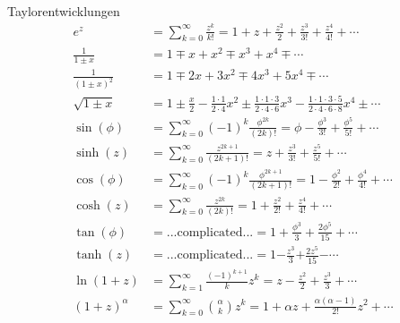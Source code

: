 \begin{Diverses}{Taylorentwicklungen}{}
    \begin{align*}
    e^z &= \sum_{k=0}^{\infty} \frac{z^k}{k!} = 1 + z + \frac{z^2}{2}+ \frac{z^3}{3!}+ \frac{z^4}{4!} + \cdots \\
    \frac{1}{1 \pm x} &= 1 \mp x + x^2 \mp x^3 + x^4 \mp \cdots\\
    \frac{1}{(1 \pm x)^2} &= 1 \mp 2x + 3x^2 \mp 4x^3 + 5x^4 \mp \cdots \\
    \sqrt{1 \pm x} &= 1 \pm \frac{x}{2} - \frac{\scriptstyle{1\cdot 1}}{\scriptstyle{2 \cdot 4}}x^2 \pm \frac{\scriptstyle{1\cdot 1 \cdot 3}}{\scriptstyle{2 \cdot 4 \cdot 6}}x^3 - \frac{\scriptstyle{1 \cdot 1 \cdot 3 \cdot 5}}{\scriptstyle{2 \cdot 4 \cdot 6 \cdot 8}}x^4 \pm \scriptstyle\cdots \\
    \sin(\phi) &= \sum_{k=0}^{\infty} (-1)^k \frac{\phi^{2k}}{(2k)!} = \phi - \frac{\phi^3}{3!} + \frac{\phi^5}{5!} + \cdots \\
    \sinh(z) &= \sum_{k=0}^{\infty} \frac{z^{2k+1}}{(2k+1)!} = z + \frac{z^3}{3!} + \frac{z^5}{5!} + \cdots\\
    \cos(\phi) &= \sum_{k=0}^{\infty} (-1)^k \frac{\phi^{2k+1}}{(2k+1)!} = 1 - \frac{\phi^2}{2!} + \frac{\phi^4}{4!} + \cdots \\
    \cosh(z) &= \sum_{k=0}^{\infty} \frac{z^{2k}}{(2k)!} = 1 + \frac{z^2}{2!} + \frac{z^4}{4!} + \cdots\\
    \tan(\phi) &= \text{...complicated...} = 1 + \frac{\phi^3}{3} + \frac{2\phi^5}{15} + \cdots \\
    \tanh(z) &= \text{...complicated...} = 1 \pmb{-} \frac{z^3}{3} \pmb{+} \frac{2z^5}{15} \pmb{-} \cdots\\
    \ln(1+z) &= \sum_{k=1}^{\infty} \frac{(-1)^{k+1}}{k}z^k = z - \frac{z^2}{2} + \frac{z^3}{3} + \scriptstyle\cdots  \\
    (1+z)^\alpha& = \sum_{k=0}^{\infty}  \binom{\alpha}{k} z^k = 1 + \alpha z + \frac{\alpha(\alpha - 1)}{2!} z ^ 2 + \scriptstyle\cdots
    \end{align*}
\end{Diverses}

